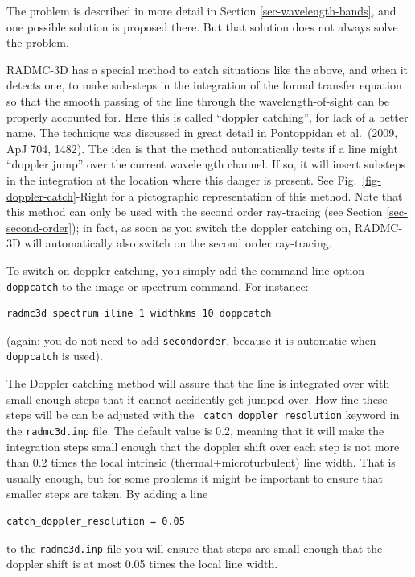 \documentclass{report}
\newenvironment{asciibox}%
  {\begin{list}{}{%
    \setlength{\topsep}{0.5em}%
    \setlength{\parskip}{0em}%
    \setlength{\parsep}{0em}%
    \setlength{\itemsep}{0em}%
    \setlength{\rightmargin}{0em}%
    \setlength{\leftmargin}{3.0em}%
    \setlength{\labelsep}{1em}%
    \setlength{\labelwidth}{2em}%
  }\normalfont\footnotesize\item}
  {\end{list}}
\begin{document}
The problem is described in more detail in Section
\ref{sec-wavelength-bands}, and one possible solution is proposed there.
But that solution does not always solve the problem.

RADMC-3D has a special method to catch situations like the above, and when
it detects one, to make sub-steps in the integration of the formal transfer
equation so that the smooth passing of the line through the
wavelength-of-sight can be properly accounted for. Here this is called
``doppler catching'', for lack of a better name. The technique was discussed
in great detail in Pontoppidan et al.~(2009, ApJ 704, 1482). The idea is
that the method automatically tests if a line might ``doppler jump'' over
the current wavelength channel. If so, it will insert substeps in the
integration at the location where this danger is present. See
Fig.~\ref{fig-doppler-catch}-Right for a pictographic representation of this
method. Note that this method can only be used with the second order
ray-tracing (see Section \ref{sec-second-order}); in fact, as soon as you
switch the doppler catching on, RADMC-3D will automatically also switch on
the second order ray-tracing.

To switch on doppler catching, you simply add the command-line option 
{\small\tt doppcatch} to the image or spectrum command. For instance:
\begin{asciibox}\begin{verbatim}
radmc3d spectrum iline 1 widthkms 10 doppcatch
\end{verbatim}\end{asciibox}
(again: you do not need to add {\small\tt secondorder}, because
it is automatic when {\small\tt doppcatch} is used). 

The Doppler catching method will assure that the line is integrated over
with small enough steps that it cannot accidently get jumped over. How fine
these steps will be can be adjusted with the {\small\tt
  catch\_doppler\_resolution} keyword in the {\small\tt radmc3d.inp}
file. The default value is 0.2, meaning that it will make the integration
steps small enough that the doppler shift over each step is not more than
0.2 times the local intrinsic (thermal+microturbulent) line width. That is
usually enough, but for some problems it might be important to ensure that
smaller steps are taken. By adding a line
\begin{asciibox}\begin{verbatim}
catch_doppler_resolution = 0.05
\end{verbatim}\end{asciibox}
to the {\small\tt radmc3d.inp} file you will ensure that steps are small
enough that the doppler shift is at most 0.05 times the local line width.
\end{document}
